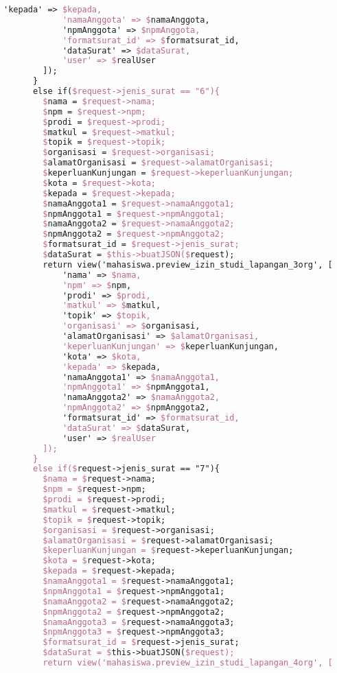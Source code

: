 \begin{lstlisting}[language=tex,basicstyle=\tiny,caption=PesanansuratController.php]
            'kepada' => $kepada,
            'namaAnggota' => $namaAnggota,
            'npmAnggota' => $npmAnggota,
            'formatsurat_id' => $formatsurat_id,
            'dataSurat' => $dataSurat,
            'user' => $realUser
        ]);
      }
      else if($request->jenis_surat == "6"){
        $nama = $request->nama;
        $npm = $request->npm;
        $prodi = $request->prodi;
        $matkul = $request->matkul;
        $topik = $request->topik;
        $organisasi = $request->organisasi;
        $alamatOrganisasi = $request->alamatOrganisasi;
        $keperluanKunjungan = $request->keperluanKunjungan;
        $kota = $request->kota;
        $kepada = $request->kepada;
        $namaAnggota1 = $request->namaAnggota1;
        $npmAnggota1 = $request->npmAnggota1;
        $namaAnggota2 = $request->namaAnggota2;
        $npmAnggota2 = $request->npmAnggota2;
        $formatsurat_id = $request->jenis_surat;
        $dataSurat = $this->buatJSON($request);
        return view('mahasiswa.preview_izin_studi_lapangan_3org', [
            'nama' => $nama,
            'npm' => $npm,
            'prodi' => $prodi,
            'matkul' => $matkul,
            'topik' => $topik,
            'organisasi' => $organisasi,
            'alamatOrganisasi' => $alamatOrganisasi,
            'keperluanKunjungan' => $keperluanKunjungan,
            'kota' => $kota,
            'kepada' => $kepada,
            'namaAnggota1' => $namaAnggota1,
            'npmAnggota1' => $npmAnggota1,
            'namaAnggota2' => $namaAnggota2,
            'npmAnggota2' => $npmAnggota2,
            'formatsurat_id' => $formatsurat_id,
            'dataSurat' => $dataSurat,
            'user' => $realUser
        ]);
      }
      else if($request->jenis_surat == "7"){
        $nama = $request->nama;
        $npm = $request->npm;
        $prodi = $request->prodi;
        $matkul = $request->matkul;
        $topik = $request->topik;
        $organisasi = $request->organisasi;
        $alamatOrganisasi = $request->alamatOrganisasi;
        $keperluanKunjungan = $request->keperluanKunjungan;
        $kota = $request->kota;
        $kepada = $request->kepada;
        $namaAnggota1 = $request->namaAnggota1;
        $npmAnggota1 = $request->npmAnggota1;
        $namaAnggota2 = $request->namaAnggota2;
        $npmAnggota2 = $request->npmAnggota2;
        $namaAnggota3 = $request->namaAnggota3;
        $npmAnggota3 = $request->npmAnggota3;
        $formatsurat_id = $request->jenis_surat;
        $dataSurat = $this->buatJSON($request);
        return view('mahasiswa.preview_izin_studi_lapangan_4org', [

\end{lstlisting}
